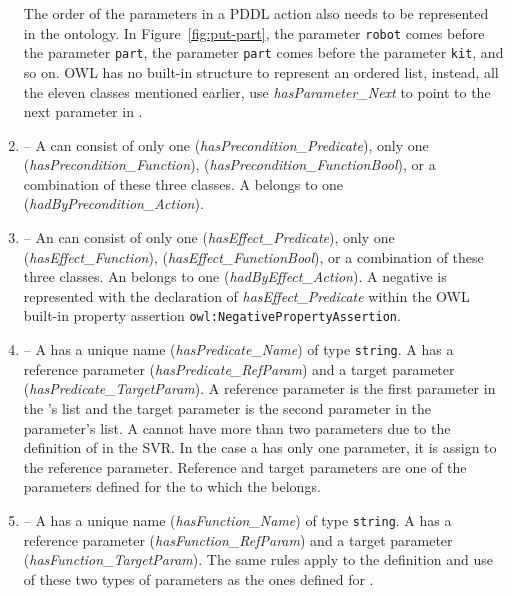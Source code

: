\begin{enumerate}
    The order of the parameters in a PDDL action also needs to be represented in the ontology. In Figure~\ref{fig:put-part}, the parameter \texttt{robot} comes before the parameter \texttt{part}, the parameter \texttt{part} comes before the parameter \texttt{kit}, and so on. OWL has no built-in structure to represent an ordered list, instead, all the eleven classes mentioned earlier, use \emph{hasParameter\_Next} to point to the next parameter in .
\item {} -- A  can consist of only one  (\emph{hasPrecondition\_Predicate}), only one  (\emph{hasPrecondition\_Function}),  (\emph{hasPrecondition\_FunctionBool}), or a combination of these three classes. A  belongs to one  (\emph{hadByPrecondition\_Action}).
\item {} -- An  can consist of only one  (\emph{hasEffect\_Predicate}), only one  (\emph{hasEffect\_Function}),  (\emph{hasEffect\_FunctionBool}), or a combination of these three classes. An  belongs to one  (\emph{hadByEffect\_Action}). A negative  is represented with the declaration of \emph{hasEffect\_Predicate} within the OWL built-in property assertion \texttt{owl:NegativePropertyAssertion}.
\item {} -- A  has a unique name (\emph{hasPredicate\_Name}) of type \texttt{string}. A  has a reference parameter (\emph{hasPredicate\_RefParam}) and a target parameter (\emph{hasPredicate\_TargetParam}). A reference parameter is the first parameter in the 's list and the target parameter is the second parameter in the parameter's list. A  cannot have more than two parameters due to the definition of  in the SVR. In the case a  has only one parameter, it is assign to the reference parameter. Reference and target parameters are one of the parameters defined for the  to which the  belongs.
\item {} -- A  has a unique name (\emph{hasFunction\_Name}) of type \texttt{string}. A  has a reference parameter (\emph{hasFunction\_RefParam}) and a target parameter (\emph{hasFunction\_TargetParam}). The same rules apply to the definition and use of these two types of parameters as the ones defined for .

\end{enumerate}
